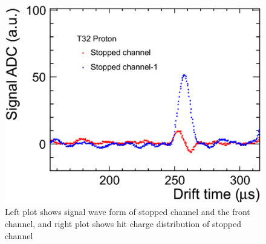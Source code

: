 
\begin{figure}[htbp]
  \begin{center}
    \includegraphics[width=1.0\hsize,clip]{fig/cross_talk_1.eps}
  \end{center}
  \caption{Left plot shows signal wave form of stopped channel and the front channel, 
    and right plot shows hit charge distribution of stopped channel}
  \label{fig:cross_talk1}
  \label{fig:cross_talk2}
\end{figure}



